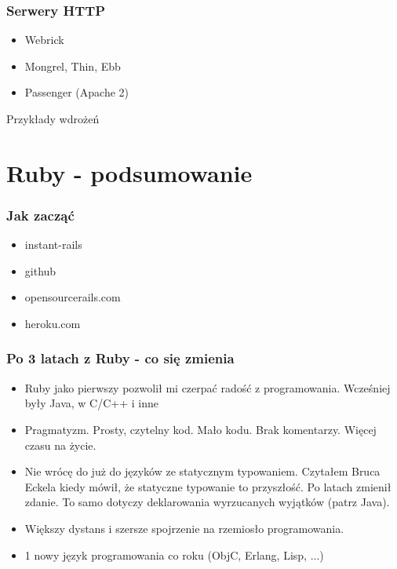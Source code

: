 \documentclass[12t]{beamer}
\begin{document}
\begin{frame}
  \frametitle{Serwery HTTP}
  \begin{itemize}
  \item Webrick
  \item Mongrel, Thin, Ebb
  \item Passenger (Apache 2)
  \end{itemize}
\end{frame}

\begin{frame}
  Przykłady wdrożeń
\end{frame}

\section{Ruby - podsumowanie}
\begin{frame}
  \frametitle{Jak zacząć}
  \begin{itemize}
  \item instant-rails
  \item github
  \item opensourcerails.com
  \item heroku.com
  \end{itemize}
\end{frame}

\begin{frame}
  \frametitle{Po 3 latach z Ruby - co się zmienia}
  \begin{itemize}
  \item Ruby jako pierwszy pozwolił mi czerpać radość z
    programowania. Wcześniej były Java, w C/C++ i inne
  \item Pragmatyzm. Prosty, czytelny kod. Mało kodu. Brak
    komentarzy. Więcej czasu na życie.
  \item Nie wrócę do już do języków ze statycznym typowaniem. Czytałem
    Bruca Eckela kiedy mówił, że statyczne typowanie to przyszłość. Po
    latach zmienił zdanie. To samo dotyczy deklarowania wyrzucanych
    wyjątków (patrz Java).
  \item Większy dystans i szersze spojrzenie na rzemiosło programowania.
  \item 1 nowy język programowania co roku (ObjC, Erlang, Lisp, ...)
  \end{itemize}
\end{frame}
\end{document}
